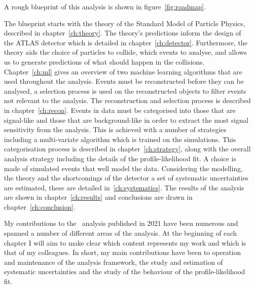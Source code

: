 A rough blueprint of this analysis is shown in figure~\ref{fig:roadmap}.%

The blueprint starts with the theory of the Standard Model of Particle Physics,
described in chapter~\ref{ch:theory}. The theory's predictions inform the
design of the ATLAS detector which is detailed in chapter~\ref{ch:detector}.
Furthermore, the theory aids the choice of particles to collide, which events to
analyse, and allows us to generate predictions of what should happen in the
collisions. Chapter~\ref{ch:ml} gives an overview of two machine learning
algorithms that are used throughout the analysis. Events must be reconstructed
before they can be analysed, a selection process is used on the reconstructed
objects to filter events not relevant to the analysis. The reconstruction and
selection process is described in chapter~\ref{ch:recon}. Events in data must
be categorised into those that are signal-like and those that are
background-like in order to extract the most signal sensitivity from the
analysis. This is achieved with a number of strategies including a multi-variate
algorithm which is trained on the simulations. This categorisation process is
described in chapter~\ref{ch:strategy}, along with the overall analysis
strategy including the details of the profile-likelihood fit. A choice is made
of simulated events that well model the data. Considering the modelling, the
theory and the shortcomings of the detector a set of systematic uncertainties
are estimated, these are detailed in~\ref{ch:systematics}. The results of the
analysis are shown in chapter~\ref{ch:results} and conclusions are drawn in
chapter~\ref{ch:conclusion}.

My contributions to the \VHbb\ analysis published in 2021 have been numerous and
spanned a number of different areas of the analysis. At the beginning of each
chapter I will aim to make clear which content represents my work and which is
that of my colleagues. In short, my main contributions have been to operation and
maintenance of the analysis framework, the study and estimation of systematic
uncertainties and the study of the behaviour of the profile-likelihood fit.
